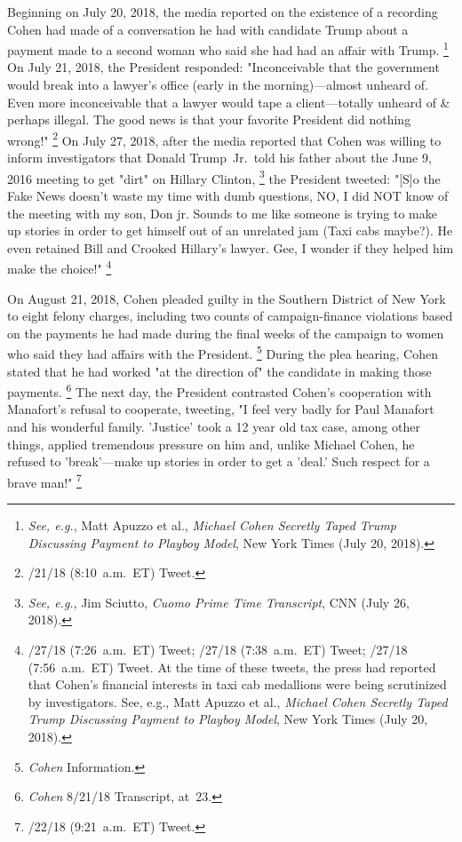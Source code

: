 {Beginning on July 20, 2018, the media reported on the existence of a recording Cohen had made of a conversation he had with candidate Trump about a payment made to a second woman who said she had had an affair with Trump.%
\footnote{\textit{See, e.g.}, Matt Apuzzo et al., \textit{Michael Cohen Secretly Taped Trump Discussing Payment to Playboy Model}, New York Times (July 20, 2018).}
On July 21, 2018, the President responded: "Inconceivable that the government would break into a lawyer's office (early in the morning)---almost unheard of.
Even more inconceivable that a lawyer would tape a client---totally unheard of \& perhaps illegal.
The good news is that your favorite President did nothing wrong!"%
\footnote{/21/18 (8:10~a.m.~ET) Tweet.}
On July 27, 2018, after the media reported that Cohen was willing to inform investigators that Donald Trump~Jr.\ told his father about the June 9, 2016 meeting to get "dirt" on Hillary Clinton,%
\footnote{\textit{See, e.g.}, Jim Sciutto, \textit{Cuomo Prime Time Transcript}, CNN (July 26, 2018).}
the President tweeted:
"[S]o the Fake News doesn't waste my time with dumb questions, NO, I did NOT know of the meeting with my son, Don jr.
Sounds to me like someone is trying to make up stories in order to get himself out of an unrelated jam (Taxi cabs maybe?).
He even retained Bill and Crooked Hillary's lawyer.
Gee, I wonder if they helped him make the choice!"%
\footnote{/27/18 (7:26~a.m.~ET) Tweet;
/27/18 (7:38~a.m.~ET) Tweet;
/27/18 (7:56~a.m.~ET) Tweet.
At the time of these tweets, the press had reported that Cohen's financial interests in taxi cab medallions were being scrutinized by investigators.
See, e.g., Matt Apuzzo et al., \textit{Michael Cohen Secretly Taped Trump Discussing Payment to Playboy Model}, New York Times (July 20, 2018).}

On August 21, 2018, Cohen pleaded guilty in the Southern District of New York to eight felony charges, including two counts of campaign-finance violations based on the payments he had made during the final weeks of the campaign to women who said they had affairs with the President.%
\footnote{\textit{Cohen} Information.}
During the plea hearing, Cohen stated that he had worked "at the direction of" the candidate in making those payments.%
\footnote{\textit{Cohen} 8/21/18 Transcript, at~23.}
The next day, the President contrasted Cohen's cooperation with Manafort's refusal to cooperate, tweeting, "I feel very badly for Paul Manafort and his wonderful family.
'Justice' took a 12 year old tax case, among other things, applied tremendous pressure on him and, unlike Michael Cohen, he refused to 'break'---make up stories in order to get a 'deal.'
Such respect for a brave man!"%
\footnote{/22/18 (9:21~a.m.~ET) Tweet.}

}
